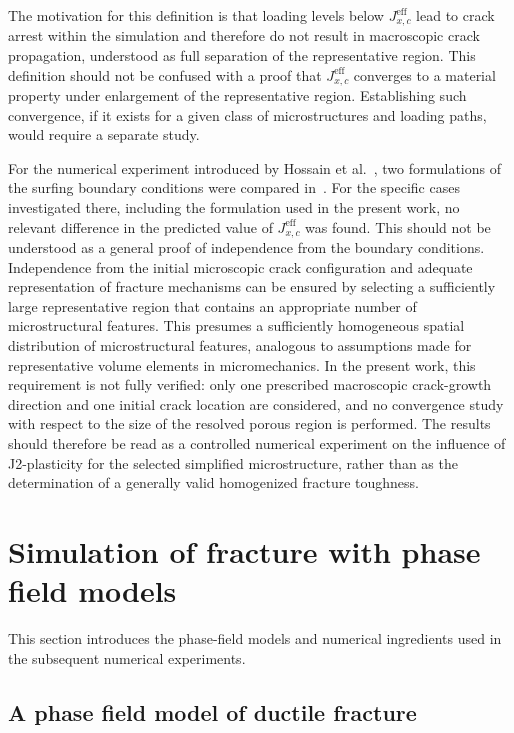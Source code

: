 \documentclass[pdflatex,sn-mathphys-num]{sn-jnl}%
\theoremstyle{thmstyleone}%
\theoremstyle{thmstyletwo}%
\theoremstyle{thmstylethree}%
\begin{document}
The motivation for this definition is that loading levels below $J_{x,c}^{\text{eff}}$ lead to crack arrest within the simulation and 
therefore do not result in macroscopic crack propagation, 
understood as full separation of the representative region.
This definition should not be confused with a proof that $J_{x,c}^{\text{eff}}$ converges to a material property under enlargement of the representative region. Establishing such convergence, if it exists for a given class of microstructures and loading paths, would require a separate study.

For the numerical experiment introduced by Hossain et al.~\cite{hossain_effective_2014}, two formulations of the surfing boundary conditions were compared in~\cite{hossain_effective_2014, bohnen_simulation_2024}. For the specific cases investigated there, including the formulation used in the present work, no relevant difference in the predicted value of $J_{x,c}^{\text{eff}}$ was found. This should not be understood as a general proof of independence from the boundary conditions.
Independence from the initial microscopic crack configuration and adequate representation of fracture mechanisms can be ensured by selecting a sufficiently large representative region that contains an appropriate number of microstructural features.
This presumes a sufficiently homogeneous spatial distribution of microstructural features, analogous to assumptions made for representative volume elements in micromechanics.
In the present work, this requirement is not fully verified: only one prescribed macroscopic crack-growth direction and one initial crack location are considered, and no convergence study with respect to the size of the resolved porous region is performed. The results should therefore be read as a controlled numerical experiment on the influence of J2-plasticity for the selected simplified microstructure, rather than as the determination of a generally valid homogenized fracture toughness.


\section{Simulation of fracture with phase field models}\label{sec:simulation_phase_field_models}

This section introduces the phase-field models and numerical ingredients used in the subsequent numerical experiments.

\subsection{A phase field model of ductile fracture}\label{sec:phase_fiel_model_ductile}
\end{document}
